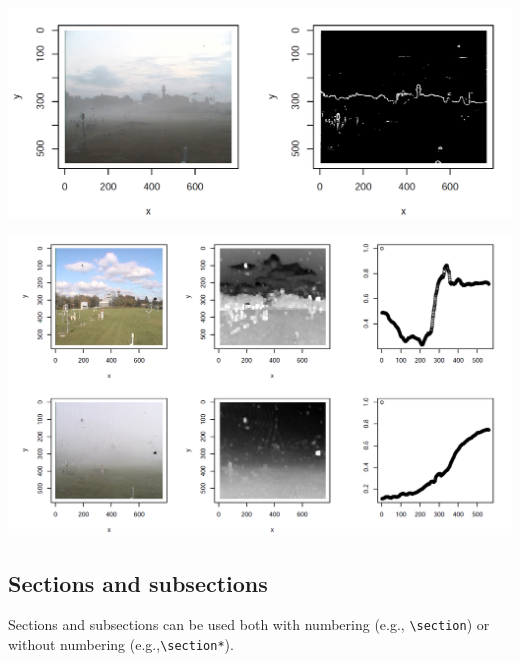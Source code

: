 \documentclass{article}
\begin{document}
\begin{minipage}[b]{\columnwidth}
	\begin{center}
	\includegraphics[width=0.95\columnwidth]{edges}
	\label{figEdges}
	\end{center}
\end{minipage}

\begin{minipage}[b]{\columnwidth}
	\begin{center}
	\includegraphics[width=0.95\columnwidth]{transmission}
	\label{figTransmission}
	\end{center}
\end{minipage}





\subsection*{Sections and subsections}
Sections and subsections can be used both with numbering (e.g., \verb|\section|) or without numbering (e.g.,\verb|\section*|).
\end{document}
